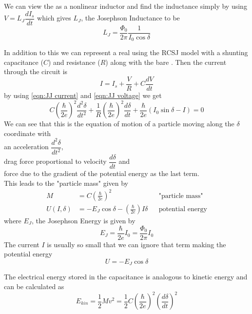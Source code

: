 We can view the \JJ as a nonlinear inductor and find the inductance simply by using $V=L_J\dfrac{dI_s}{dt}$ which gives $L_J$, the Josephson Inductance to be
\begin{equation}
L_J=\frac{\Phi_0}{2\pi}\frac{1}{I_0\cos\delta}
\end{equation}

In addition to this we can represent a real \JJ using the RCSJ model with a shunting capacitance ($C$) and resistance ($R$) along with the bare \JJ \cite{Harmans1997}. Then the current through the circuit is
\begin{equation}
I=I_s+\frac{V}{R}+C\frac{dV}{dt}
\end{equation}
by using \ref{eqn:JJ current} and \ref{eqn:JJ voltage} we get
\begin{equation}
C\left(\frac{\hbar}{2e}\right)^2\frac{d^2\delta}{dt^2}+\frac{1}{R}\left(\frac{\hbar}{2e}\right)^2\frac{d\delta}{dt}+\frac{\hbar}{2e}(I_0\sin\delta-I)=0
\end{equation}
We can see that this is the equation of motion of a particle moving along the $\delta$ coordinate with\\ an acceleration $\dfrac{d^2\delta}{dt^2}$,\\ drag force proportional to velocity $\dfrac{d\delta}{dt}$ and\\ force due to the gradient of the potential energy as the last term.\\
This leads to the "particle mass" given by
\begin{align}
M&=C\left(\frac{\hbar}{2e}\right)^2&&\text{"particle mass"}\\
U(I,\delta)&=-E_J\cos\delta-\left(\frac{\hbar}{2e}\right)I\delta&&\text{potential energy}
\end{align}
where $E_J$, the Josephson Energy is given by
\begin{equation}
E_J=\frac{\hbar}{2e}I_0=\frac{\Phi_0}{2\pi}I_0
\end{equation}
The current $I$ is usually so small that we can ignore that term making the potential energy
\begin{equation}
U=-E_J\cos\delta
\label{eqn:JJ potential energy}
\end{equation}

The electrical energy stored in the capacitance is analogous to kinetic energy and can be calculated as
\begin{equation}
E_{kin}=\frac{1}{2}Mv^2=\frac{1}{2}C\left(\frac{\hbar}{2e}\right)^2\left(\frac{d\delta}{dt}\right)^2
\end{equation}

